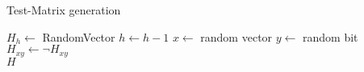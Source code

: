 \begin{algorithm}[H]
    \caption{Test-Matrix generation}
    \label{matrixgen}
    \begin{algorithmic}[1]
                \State $H_h \gets $ RandomVector
                \State $h \gets h - 1$
            \EndWhile
                \State $x \gets $ random vector
                \State $y \gets $ random bit
                \State $H_{xy} \gets \lnot H_{xy}$
            \EndWhile \\
            \Return $H$
        \EndProcedure
    \end{algorithmic}
\end{algorithm}